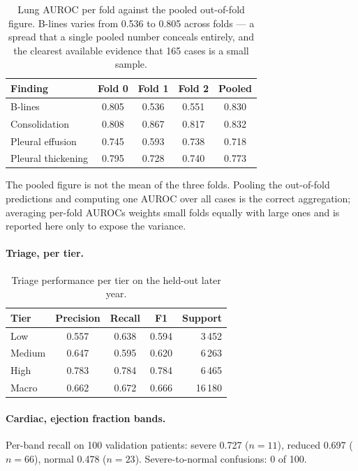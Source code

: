 \begin{table}[H]
  \centering
  \small
  \begin{tabular}{@{}lcccc@{}}
    \toprule
    Finding & Fold 0 & Fold 1 & Fold 2 & Pooled \\
    \midrule
    B-lines & 0.805 & 0.536 & 0.551 & 0.830 \\
    Consolidation & 0.808 & 0.867 & 0.817 & 0.832 \\
    Pleural effusion & 0.745 & 0.593 & 0.738 & 0.718 \\
    Pleural thickening & 0.795 & 0.728 & 0.740 & 0.773 \\
    \bottomrule
  \end{tabular}
  \caption{Lung AUROC per fold against the pooled out-of-fold figure. B-lines varies from 0.536
    to 0.805 across folds --- a spread that a single pooled number conceals entirely, and the
    clearest available evidence that 165 cases is a small sample.}
  \label{tab:app-lung-folds}
\end{table}

The pooled figure is not the mean of the three folds. Pooling the out-of-fold predictions and
computing one AUROC over all cases is the correct aggregation; averaging per-fold AUROCs weights
small folds equally with large ones and is reported here only to expose the variance.

\paragraph{Triage, per tier.}

\begin{table}[H]
  \centering
  \small
  \begin{tabular}{@{}lcccr@{}}
    \toprule
    Tier & Precision & Recall & F1 & Support \\
    \midrule
    Low & 0.557 & 0.638 & 0.594 & 3\,452 \\
    Medium & 0.647 & 0.595 & 0.620 & 6\,263 \\
    High & 0.783 & 0.784 & 0.784 & 6\,465 \\
    \midrule
    Macro & 0.662 & 0.672 & 0.666 & 16\,180 \\
    \bottomrule
  \end{tabular}
  \caption{Triage performance per tier on the held-out later year.}
  \label{tab:app-triage}
\end{table}

\paragraph{Cardiac, ejection fraction bands.} Per-band recall on 100 validation patients:
severe 0.727 ($n=11$), reduced 0.697 ($n=66$), normal 0.478 ($n=23$). Severe-to-normal
confusions: 0 of 100.

